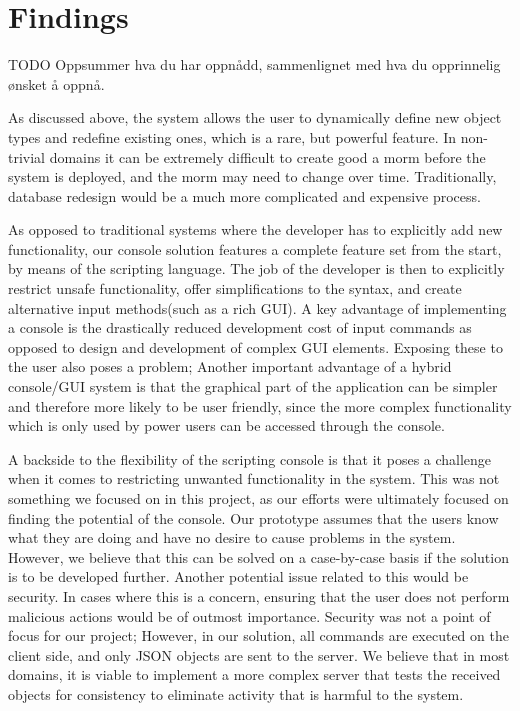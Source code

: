 \section{Findings}
TODO
Oppsummer hva du har oppnådd,
sammenlignet med hva du opprinnelig ønsket å oppnå.

As discussed above, the system allows the user to dynamically define new object types and redefine existing ones, which is a rare, but powerful feature. In non-trivial domains it can be extremely difficult to create good a morm before the system is deployed, and the morm may need to change over time. Traditionally, database redesign would be a much more complicated and expensive process.
\cite{kroenke2006database}

As opposed to traditional systems where the developer has to explicitly add new functionality, our console solution features a complete feature set from the start, by means of the scripting language. The job of the developer is then to explicitly restrict unsafe functionality, offer simplifications to the syntax, and create alternative input methods(such as a rich GUI). A key advantage of implementing a console is the drastically reduced development cost of input commands as opposed to design and development of complex GUI elements. Exposing these to the user also poses a problem; Another important advantage of a hybrid console/GUI system is that the graphical part of the application can be simpler and therefore more likely to be user friendly, since the more complex functionality which is only used by power users can be accessed through the console.

A backside to the flexibility of the scripting console is that it poses a challenge when it comes to restricting unwanted functionality in the system. This was not something we focused on in this project, as our efforts were ultimately focused on finding the potential of the console. Our prototype assumes that the users know what they are doing and have no desire to cause problems in the system. However, we believe that this can be solved on a case-by-case basis if the solution is to be developed further. Another potential issue related to this would be security. In cases where this is a concern, ensuring that the user does not perform malicious actions would be of outmost importance. Security was not a point of focus for our project; However, in our solution, all commands are executed on the client side, and only JSON objects are sent to the server. We believe that in most domains, it is viable to implement a more complex server that tests the received objects for consistency to eliminate activity that is harmful to the system.


